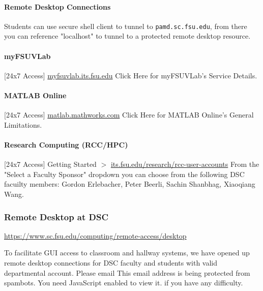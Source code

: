 \documentclass[12pt,a4paper]{article}
\begin{document}
\paragraph{Remote Desktop Connections}
Students can use secure shell client to tunnel to \texttt{pamd.sc.fsu.edu}, from there you can reference "localhost" to tunnel to a protected remote desktop resource.

\paragraph{myFSUVLab}
[24x7 Access]
\url{myfsuvlab.its.fsu.edu}
Click Here for myFSUVLab's Service Details.

\paragraph{MATLAB Online}
[24x7 Access]
\url{matlab.mathworks.com}
Click Here for MATLAB Online's General Limitations.

\paragraph{Research Computing (RCC/HPC)}
[24x7 Access]
Getting Started $>$ \url{its.fsu.edu/research/rcc-user-accounts}
From the "Select a Faculty Sponsor" dropdown you can choose from the following DSC facuilty members: Gordon Erlebacher, Peter Beerli, Sachin Shanbhag, Xiaoqiang Wang.

\subsubsection{Remote Desktop at DSC}
\url{https://www.sc.fsu.edu/computing/remote-access/desktop}

To facilitate GUI access to classroom and hallway systems, we have opened up remote desktop connections for DSC faculty and students with valid departmental account. Please email This email address is being protected from spambots. You need JavaScript enabled to view it. if you have any difficulty.
\end{document}
